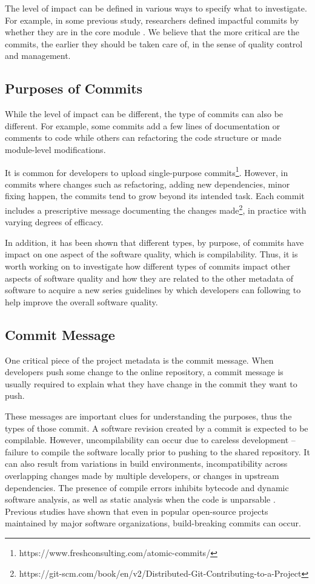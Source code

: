 The level of impact can be defined in various ways to specify what to investigate. For example, in some previous study, researchers defined impactful commits by whether they are in the core module \cite{pooyan_esem, pooyan_qrs}.
We believe that the more critical are the commits, the earlier they should be taken care of, in the sense of quality control and management. 

\subsection{Purposes of Commits}
While the level of impact can be different, the type of commits can also be different.
For example, some commits add a few lines of documentation or comments to code while others can refactoring the code structure or made module-level modifications.

It is common for developers to upload single-purpose commits\footnote{https://www.freshconsulting.com/atomic-commits/}. 
However, in commits where changes such as refactoring, adding new dependencies, minor fixing happen, the commits tend to grow beyond its intended task. 
Each commit includes a prescriptive message documenting the changes made\footnote{https://git-scm.com/book/en/v2/Distributed-Git-Contributing-to-a-Project}, in practice with varying degrees of efficacy. 

In addition, it has been shown that different types, by purpose, of commits have impact on one aspect of the software quality, which is compilability\cite{qrs2020}.
Thus, it is worth working on to investigate how different types of commits impact other aspects of software quality and how they are related to the other metadata of software to acquire a new series guidelines by which developers can following to help improve the overall software quality.

\subsection{Commit Message}
One critical piece of the project metadata is the commit message. 
When developers push some change to the online repository, a commit message is usually required to explain what they have change in the commit they want to push.

These messages are important clues for understanding the purposes, thus the types of those commit.
A software revision created by a commit is expected to be compilable. However, uncompilability can occur due to careless development -- failure to compile the software locally prior to pushing to the shared repository. It can also result from variations in build environments, incompatibility across overlapping changes made by multiple developers, or changes in upstream dependencies. 
The presence of compile errors inhibits bytecode and dynamic software analysis, as well as static analysis when the code is unparsable \cite{pooyan_esem}.
Previous studies \cite{pooyan_esem, 8170083, Hassan2017ESEM, SMR:SMR1838} have shown that even in popular open-source projects maintained by major software organizations, build-breaking commits can occur.

